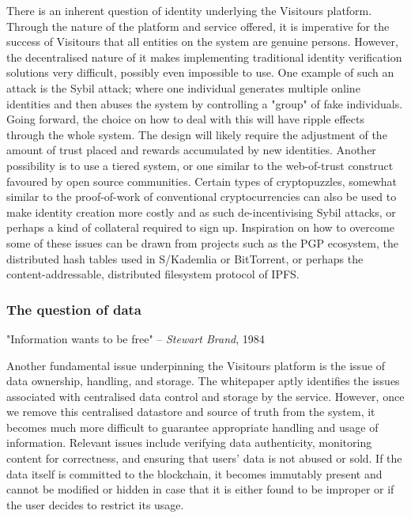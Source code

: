 \documentclass[fontsize=12pt,a4paper]{article}
\begin{document}
There is an inherent question of identity underlying the Visitours platform. Through the nature of the platform and service offered, it is imperative for the success of Visitours that all entities on the system are genuine persons. However, the decentralised nature of it makes implementing traditional identity verification solutions very difficult, possibly even impossible to use. One example of such an attack is the Sybil attack; where one individual generates multiple online identities and then abuses the system by controlling a "group" of fake individuals. Going forward, the choice on how to deal with this will have ripple effects through the whole system. The design will likely require the adjustment of the amount of trust placed and rewards accumulated by new identities. Another possibility is to use a tiered system, or one similar to the web-of-trust construct favoured by open source communities. Certain types of cryptopuzzles, somewhat similar to the proof-of-work of conventional cryptocurrencies can also be used to make identity creation more costly and as such de-incentivising Sybil attacks, or perhaps a kind of collateral required to sign up. Inspiration on how to overcome some of these issues can be drawn from projects such as the PGP ecosystem, the distributed hash tables used in S/Kademlia or BitTorrent, or perhaps the content-addressable, distributed filesystem protocol of IPFS.

\subsubsection*{The question of data}
 
"Information wants to be free" -- \textit{Stewart Brand}, 1984 \newline

Another fundamental issue underpinning the Visitours platform is the issue of data ownership, handling, and storage. The whitepaper aptly identifies the issues associated with centralised data control and storage by the service. However, once we remove this centralised datastore and source of truth from the system, it becomes much more difficult to guarantee appropriate handling and usage of information. Relevant issues include verifying data authenticity, monitoring content for correctness, and ensuring that users' data is not abused or sold. If the data itself is committed to the blockchain, it becomes immutably present and cannot be modified or hidden in case that it is either found to be improper or if the user decides to restrict its usage.
\end{document}

